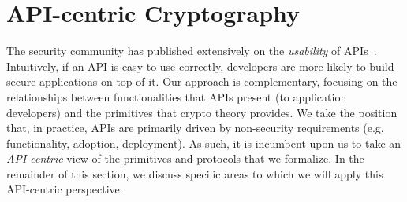 \section{API-centric Cryptography}
The security community has published extensively on the \emph{usability} of
APIs~\cite{ABF+}.  Intuitively, if
an API is easy to use correctly, developers are more likely to build secure
applications on top of it.
%
Our approach is complementary, focusing on the relationships between
functionalities that APIs present (to application developers) and the primitives
that crypto theory provides. We take the position that, in practice, APIs are
primarily driven by non-security requirements (e.g. functionality, adoption,
deployment).
%
As such, it is incumbent upon us to take an \emph{API-centric} view of the
primitives and protocols that we formalize.  In the remainder of this section,
we discuss specific areas to which we will apply this API-centric perspective.


